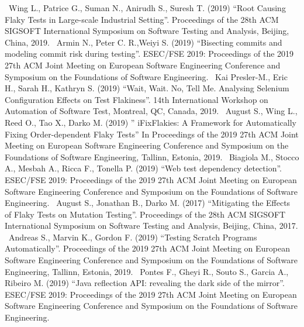 \newline~\newline
[S17] Wing L., Patrice G., Suman N., Anirudh S., Suresh T. (2019) “Root Causing Flaky Tests in Large-scale Industrial Setting”. Proceedings of the 28th ACM SIGSOFT International Symposium on Software Testing and Analysis, Beijing, China, 2019.
\newline~\newline
[S18] Armin N., Peter C. R.,Weiyi S. (2019) “Bisecting commits and
modeling commit risk during testing”. ESEC/FSE 2019: Proceedings of the 2019 27th ACM Joint Meeting on European Software Engineering Conference and Symposium on the Foundations of Software Engineering.
\newline~\newline
[S19] Kai Presler-M., Eric H., Sarah H., Kathryn S. (2019) “Wait, Wait. No, Tell Me. Analysing Selenium Configuration Effects on Test Flakiness”. 14th International Workshop on Automation of Software Test, Montreal, QC, Canada, 2019.
\newline~\newline
[S20] August S., Wing L., Reed O., Tao X., Darko M. (2019) ” iFixFlakies: A Framework for Automatically Fixing Order-dependent Flaky Tests” In Proceedings of the 2019 27th ACM Joint Meeting on European Software Engineering Conference and Symposium on the Foundations of Software Engineering, Tallinn, Estonia, 2019.
\newline~\newline
[S21] Biagiola M., Stocco A., Mesbah A., Ricca F., Tonella P. (2019) “Web test dependency detection”. ESEC/FSE 2019: Proceedings of the 2019 27th ACM Joint Meeting on European Software Engineering Conference and Symposium on the Foundations of Software Engineering.
\newline~\newline
[S22] August S., Jonathan B., Darko M. (2017) “Mitigating the Effects of Flaky Tests on Mutation Testing”. Proceedings of the 28th ACM SIGSOFT International Symposium on Software Testing and Analysis, Beijing, China, 2017.
\newline~\newline
[S23] Andreas S., Marvin K., Gordon F. (2019) “Testing Scratch Programs Automatically”. Proceedings of the 2019 27th ACM Joint Meeting on European Software Engineering Conference and Symposium on the Foundations of Software Engineering, Tallinn, Estonia, 2019.
\newline~\newline
[S24] Pontes F., Gheyi R., Souto S., Garcia A., Ribeiro M. (2019) “Java reflection API: revealing the dark side of the mirror”. ESEC/FSE 2019: Proceedings of the 2019 27th ACM Joint Meeting on European Software Engineering Conference and Symposium on the Foundations of Software Engineering.
